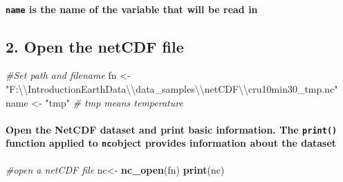 \documentclass[]{article}
\newenvironment{Shaded}{\begin{snugshade}}{\end{snugshade}}
\newcommand{\KeywordTok}[1]{\textcolor[rgb]{0.13,0.29,0.53}{\textbf{#1}}}
\newcommand{\CharTok}[1]{\textcolor[rgb]{0.31,0.60,0.02}{#1}}
\newcommand{\StringTok}[1]{\textcolor[rgb]{0.31,0.60,0.02}{#1}}
\newcommand{\CommentTok}[1]{\textcolor[rgb]{0.56,0.35,0.01}{\textit{#1}}}
\newcommand{\NormalTok}[1]{#1}
\let\oldparagraph\paragraph
\renewcommand{\paragraph}[1]{\oldparagraph{#1}\mbox{}}
\begin{document}
\paragraph{\texorpdfstring{\texttt{name} is the name of the variable
that will be read
in}{name is the name of the variable that will be read in}}\label{name-is-the-name-of-the-variable-that-will-be-read-in}

\subsection{2. Open the netCDF file}\label{open-the-netcdf-file}

\begin{Shaded}
\begin{Highlighting}[]
\CommentTok{#Set path and filename}
\NormalTok{fn <-}\StringTok{ "F:}\CharTok{\textbackslash{}\textbackslash{}}\StringTok{IntroductionEarthData}\CharTok{\textbackslash{}\textbackslash{}}\StringTok{data_samples}\CharTok{\textbackslash{}\textbackslash{}}\StringTok{netCDF}\CharTok{\textbackslash{}\textbackslash{}}\StringTok{cru10min30_tmp.nc"}
\NormalTok{name <-}\StringTok{ "tmp"}    \CommentTok{# tmp means temperature }
\end{Highlighting}
\end{Shaded}

\paragraph{\texorpdfstring{Open the NetCDF dataset and print basic
information. The \texttt{print()} function applied to \texttt{nc}object
provides information about the
dataset}{Open the NetCDF dataset and print basic information. The print() function applied to ncobject provides information about the dataset}}\label{open-the-netcdf-dataset-and-print-basic-information.-the-print-function-applied-to-ncobject-provides-information-about-the-dataset}

\begin{Shaded}
\begin{Highlighting}[]
\CommentTok{#open a netCDF file}
\NormalTok{nc<-}\StringTok{ }\KeywordTok{nc_open}\NormalTok{(fn)}
\KeywordTok{print}\NormalTok{(nc)}
\end{Highlighting}
\end{Shaded}
\end{document}
